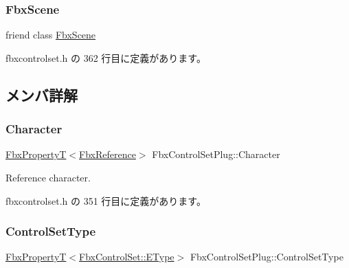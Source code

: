 \subsubsection{\texorpdfstring{Fbx\+Scene}{FbxScene}}
{\footnotesize\ttfamily friend class \hyperlink{class_fbx_scene}{Fbx\+Scene}\hspace{0.3cm}{\ttfamily [friend]}}



 fbxcontrolset.\+h の 362 行目に定義があります。



\subsection{メンバ詳解}
\mbox{\label{class_fbx_control_set_plug_ab6b2b323fb163f6c57121ff755fda602}} 
\subsubsection{\texorpdfstring{Character}{Character}}
{\footnotesize\ttfamily \hyperlink{class_fbx_property_t}{Fbx\+PropertyT}$<$\hyperlink{fbxtypes_8h_a44df6a2eec915cf27cd481e5c5e48a24}{Fbx\+Reference}$>$ Fbx\+Control\+Set\+Plug\+::\+Character}



Reference character. 



 fbxcontrolset.\+h の 351 行目に定義があります。

\mbox{\label{class_fbx_control_set_plug_ac721dfc2da9b51b8a90c1df5f679e496}} 
\subsubsection{\texorpdfstring{Control\+Set\+Type}{ControlSetType}}
{\footnotesize\ttfamily \hyperlink{class_fbx_property_t}{Fbx\+PropertyT}$<$\hyperlink{class_fbx_control_set_a13a51702c46fff33d50c05d20f3d9f04}{Fbx\+Control\+Set\+::\+E\+Type}$>$ Fbx\+Control\+Set\+Plug\+::\+Control\+Set\+Type}



